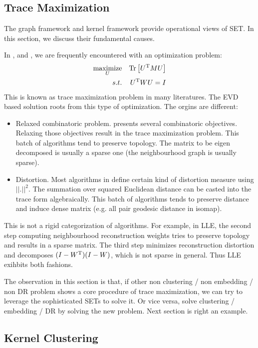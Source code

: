 \subsection{Trace Maximization}
\label{sec:trmax}

The graph framework and kernel framework provide 
operational views of SET. In this section, we 
discuss their fundamental causes. 

In \rsec{\ref{sec:framework}}, \rsec{\ref{sec:justification}}
and \rsec{\ref{sec:nldr}}, we are frequently encountered with 
an optimization problem:
\begin{eqnarray}
	\operatorname*{maximize}_{U} && { \mathrm{Tr}\left[U^\mathrm{T}MU\right] } \nonumber \\
	s.t. && U^\mathrm{T} W U = I
\end{eqnarray}
This is known as trace maximization problem in many literatures. 
The EVD based solution roots from this type of optimization. 
The orgins are different:
\begin{itemize}
	\item Relaxed combinatoric problem. \rsec{\ref{sec:combinatoric}} 
	presents several combinatoric objectives. Relaxing those objectives
	result in the trace maximization problem.
	This batch of algorithms tend to preserve topology.  
	The matrix to be eigen 
	decomposed is usually a sparse one (the neighbourhood graph 
	is usually sparse). 
	\item Distortion. Most algorithms in \rsec{\ref{sec:nldr}} 
	define certain kind of distortion measure using $ ||.||^2 $.
	The summation over squared Euclidean distance can be casted 
	into the trace form algebraically. This batch of algorithms 
	tends to preserve distance and induce dense matrix
	(e.g. all pair geodesic distance in isomap).  
\end{itemize}
This is not a rigid categorization of algorithms. For example, 
in LLE, the second step computing neighbourhood reconstruction 
weights tries to preserve topology and 
results in a sparse matrix. The third step 
minimizes reconstruction distortion and decomposes
$ (I - W^\mathrm{T})(I - W) $, which is not sparse in general. 
Thus LLE exihbits both fashions. 

The observation in this section is that, if 
other non clustering / non embedding / non DR problem 
shows a core procedure of trace maximization, we 
can try to leverage the sophisticated SETs to solve it. 
Or vice versa, solve clustering / embedding / DR by solving 
the new problem. Next section is right an example. 

\subsection{Kernel Clustering}
\label{sec:kcluster}


